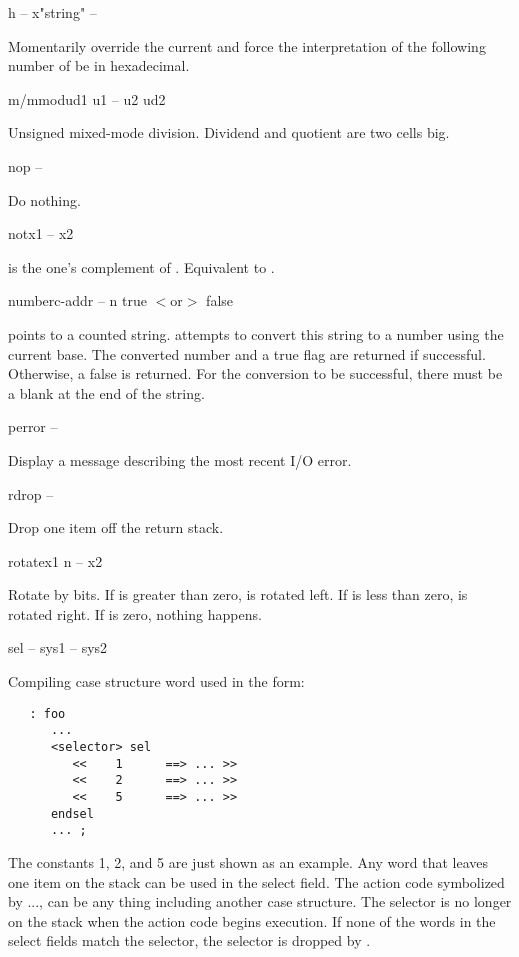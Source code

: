 \begin{cgloss}{h }{ -- x}{"string" -- }

Momentarily override the current  and force the interpretation
of the following number of be in hexadecimal.
\end{cgloss}
\begin{gloss}{m/mmod}{ud1 u1 -- u2 ud2}

Unsigned mixed-mode division.  Dividend and quotient are two cells big.
\end{gloss}
\begin{gloss}{nop}{ -- }

Do nothing.
\end{gloss}
\begin{gloss}{not}{x1 -- x2}

 is the one's complement of .  Equivalent to .
\end{gloss}
\begin{gloss}{number}{c-addr -- n true $<$or$>$ false}

 points to a counted string.  
attempts to convert this string
to a number using the current base.  The converted number 
and a true flag
are returned if successful.  Otherwise, a false is returned.  For the
conversion to be successful, there must be a blank at the end
of the string.
\end{gloss}
\begin{gloss}{perror}{ -- }

Display a message describing the most recent I/O error.
\end{gloss}
\begin{gloss}{rdrop}{ -- }

Drop one item off the return stack.
\end{gloss}
\begin{gloss}{rotate}{x1 n -- x2}

Rotate  by  bits.  If  is greater than zero,
 is rotated left.  If
 is less than zero,  is rotated right.  If 
is zero, nothing happens.
\end{gloss}
\begin{cgloss}{sel}{ -- }{sys1 -- sys2}

Compiling case structure word used in the form:
\begin{verbatim}
   : foo
      ...
      <selector> sel
         <<    1      ==> ... >>
         <<    2      ==> ... >>
         <<    5      ==> ... >>
      endsel
	  ... ;
\end{verbatim}
The constants 1, 2, and 5 are just shown as an example.  Any word that
leaves
one item on the stack can be used in the select field.  The action code 
symbolized by ..., can be any thing including another case structure.  The
selector is no longer on the stack when the action code begins execution.
If none of the words in the select
fields match the selector, the selector is dropped by .
\end{cgloss}
